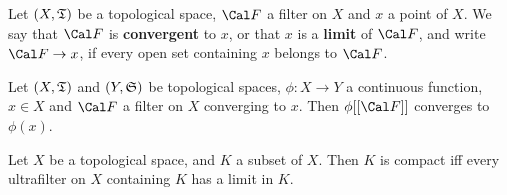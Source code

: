  Let $(X,\frak T)$ be a topological
space, $\Cal F$ a filter on $X$ and $x$ a point of
$X$.   We say that $\Cal F$ is
{\bf convergent} to $x$, or that $x$ is a {\bf limit} of $\Cal F$, and
write $\Cal F\to x$, if
every open set containing $x$ belongs to $\Cal F$.

 Let $(X,\frak T)$ and $(Y,\frak S)$ be
topological spaces,
$\phi:X\to Y$ a continuous function, $x\in X$ and $\Cal F$ a filter on
$X$ converging to $x$.   Then $\phi[[\Cal F]]$ converges to $\phi(x)$.

 Let $X$ be a topological space, and $K$ a subset
of $X$.   Then $K$ is compact iff every ultrafilter on $X$  containing
$K$ has a limit in $K$.

